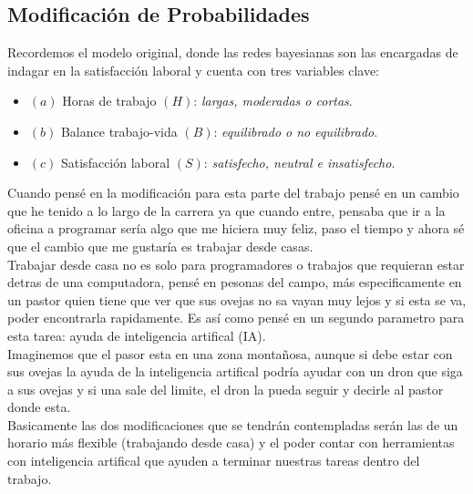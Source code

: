 \subsection{Modificación de Probabilidades}

Recordemos el modelo original, donde las redes bayesianas son las encargadas de indagar en 
la satisfacción laboral y cuenta con tres variables clave:
\begin{itemize}
    \item[] $(a)$ Horas de trabajo $(H)$: \textit{largas, moderadas o cortas}.
    \item[] $(b)$ Balance trabajo-vida $(B)$: \textit{equilibrado o no equilibrado}.
    \item[] $(c)$ Satisfacción laboral $(S)$: \textit{satisfecho, neutral e insatisfecho}.
\end{itemize}


Cuando pensé en la modificación para esta parte del trabajo pensé en un cambio que he tenido
a lo largo de la carrera ya que cuando entre, pensaba que ir a la oficina a programar sería 
algo que me hiciera muy feliz, paso el tiempo y ahora sé que el cambio que me gustaría es 
trabajar desde casas. \\ 

Trabajar desde casa no es solo para programadores o trabajos que requieran estar detras de 
una computadora, pensé en pesonas del campo, más especificamente en un pastor quien tiene que 
ver que sus ovejas no sa vayan muy lejos y si esta se va, poder encontrarla rapidamente. Es 
así como pensé en un segundo parametro para esta tarea: ayuda de inteligencia artifical (IA). \\ 

Imaginemos que el pasor esta en una zona montañosa, aunque si debe estar con sus ovejas 
la ayuda de la inteligencia artifical podría ayudar con un dron que siga a sus ovejas y si 
una sale del limite, el dron la pueda seguir y decirle al pastor donde esta. \\ 

Basicamente las dos modificaciones que se tendrán contempladas serán las de un horario más 
flexible (trabajando desde casa) y el poder contar con herramientas con inteligencia artifical
que ayuden a terminar nuestras tareas dentro del trabajo.\\ 


